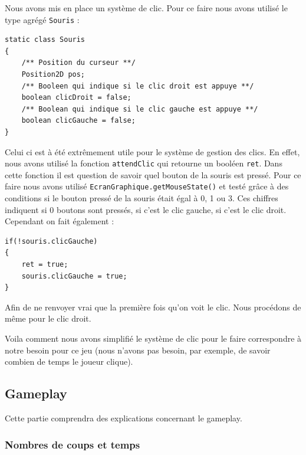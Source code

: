 \documentclass[]{article}
\newcommand{\variable}[1]{\noindent \texttt{#1}}
\begin{document}
Nous avons mis en place un système de clic. Pour ce faire nous avons utilisé le type agrégé \variable{Souris} : 

\begin{lstlisting}
static class Souris
{
    /** Position du curseur **/
    Position2D pos;
    /** Booleen qui indique si le clic droit est appuye **/
    boolean clicDroit = false;
    /** Boolean qui indique si le clic gauche est appuye **/
    boolean clicGauche = false;
}
\end{lstlisting}

Celui ci est à été extrêmement utile pour le système de gestion des clics. En effet, 
nous avons utilisé la fonction \variable{attendClic} qui retourne un booléen \variable{ret}. Dans cette fonction il est question de savoir quel bouton de la souris est pressé. Pour ce faire nous avons utilisé \variable{EcranGraphique.getMouseState()} et testé grâce à des conditions si le bouton pressé de la souris était égal à 0, 1 ou 3. Ces chiffres indiquent si 0 boutons sont pressés, si c'est le clic gauche, si c'est le clic droit. Cependant on fait également : 
\begin{lstlisting}
if(!souris.clicGauche)
{
    ret = true;
    souris.clicGauche = true;
}
\end{lstlisting}

Afin de ne renvoyer vrai que la première fois qu'on voit le clic. Nous procédons de même pour le clic droit.

Voila comment nous avons simplifié le système de clic pour le faire correspondre à notre besoin pour ce jeu (nous n'avons pas besoin, par exemple, de savoir combien de temps le joueur clique).


\newpage
\subsection{Gameplay}

Cette partie comprendra des explications concernant le gameplay. 

\subsubsection{Nombres de coups et temps}
\end{document}
